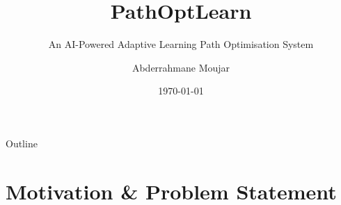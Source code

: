 \documentclass[aspectratio=169,9pt]{beamer}
\title[PathOptLearn]{\textbf{PathOptLearn}}
\subtitle{An AI-Powered Adaptive Learning Path Optimisation System}
\author{Abderrahmane Moujar}
\institute{Department of Computer Science}
\date{\today}
\begin{document}
\begin{frame}[plain]
\titlepage
\end{frame}

\begin{frame}{Outline}
\tableofcontents
\end{frame}

\section{Motivation \& Problem Statement}
\end{document}
